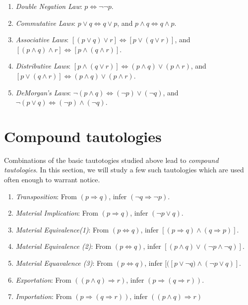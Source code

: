 \begin{enumerate}
\item \textit{Double Negation Law}: $p \Leftrightarrow \neg \neg p$. 
\item \textit{Commutative Laws}: $p \lor q \Leftrightarrow q \lor p$, and $p \land q \Leftrightarrow q \land p$. 
\item \textit{Associative Laws}: $[(p \lor q) \lor r] \Leftrightarrow [p \lor (q \lor r)]$, and $[(p \land q) \land r] \Leftrightarrow [p \land (q \land r)]$.
\item \textit{Distributive Laws}: $[p \land (q \lor r)] \Leftrightarrow (p \land q) \lor (p \land r)$, and $[p \lor (q \land r)] \Leftrightarrow (p \land q) \lor (p \land r)$. 
\item \textit{DeMorgan's Laws}: $\neg (p \land q) \Leftrightarrow (\neg p) \lor (\neg q)$, and $\neg (p \lor q) \Leftrightarrow (\neg p) \land (\neg q)$. 
\end{enumerate}

\section{Compound tautologies}
Combinations of the basic tautotogies studied above lead to \textit{compound tautologies}. In this section, we will study a few such tautologies which are used often enough to warrant notice. 

\begin{enumerate}
\item \textit{Transposition}: From $(p \Rightarrow q)$, infer $(\neg q \Rightarrow \neg p)$. 
\item \textit{Material Implication}: From $(p \Rightarrow q)$, infer $(\neg p \lor q)$. 
\item \textit{Material Equivalence(1)}: From $(p\Leftrightarrow q)$, infer $[(p \Rightarrow q) \land (q \Rightarrow p)]$.
\item \textit{Material Equivalence (2)}: From $(p \Leftrightarrow q)$, infer $[(p \land q) \lor (\neg p \land \neg q)]$.
\item \textit{Material Equavalence (3)}: From $(p \Leftrightarrow q)$, infer $[([p\lor \neg q) \land (\neg p \lor q)]$.
\item \textit{Exportation}: From $((p\land q) \Rightarrow r)$, infer $(p \Rightarrow (q \Rightarrow r))$.
\item \textit{Importation}: From $(p \Rightarrow (q \Rightarrow r))$, infer $((p\land q) \Rightarrow r)$
\end{enumerate}

